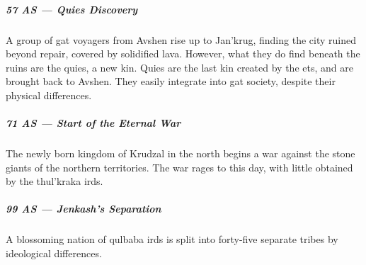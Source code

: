 \subparagraph{57 AS --- Quies Discovery} A group of gat voyagers from Avshen rise up to Jan'krug, finding the city ruined beyond repair, covered by solidified lava.
However, what they do find beneath the ruins are the quies, a new kin.
Quies are the last kin created by the ets, and are brought back to Avshen.
They easily integrate into gat society, despite their physical differences.

\subparagraph{71 AS --- Start of the Eternal War} The newly born kingdom of Krudzal in the north begins a war against the stone giants of the northern territories.
The war rages to this day, with little obtained by the thul'kraka irds.

\subparagraph{99 AS --- Jenkash's Separation} A blossoming nation of qulbaba irds is split into forty-five separate tribes by ideological differences.

